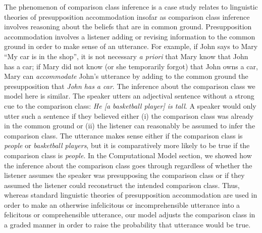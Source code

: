 \documentclass[doc]{apa6}
\begin{document}
The phenomenon of comparison class inference is a case study relates to linguistic theories of presupposition accommodation insofar as comparison class inference involves reasoning about the beliefs that are in common ground.
Presupposition accommodation involves a listener adding or revising information to the common ground in order to make sense of an utterance. For example, if John says to Mary ``My car is in the shop'', it is not necessary \emph{a priori} that Mary know that John has a car; if Mary did not know (or she temporarily forgot) that John owns a car, Mary can \emph{accommodate} John's utterance by adding to the common ground the presupposition that \emph{John has a car}. 
The inference about the comparison class we model here is similar. 
The speaker utters an adjectival sentence without a strong cue to the comparison class: \emph{He [a basketball player] is tall}. 
A speaker would only utter such a sentence if they believed either (i) the comparison class was already in the common ground or (ii) the listener can reasonably be assumed to infer the comparison class.
The utterance makes sense either if the comparison class is \emph{people} or \emph{basketball players}, but it is comparatively more likely to be true if the comparison class is \emph{people}. 
In the Computational Model section, we showed how the inference about the comparison class goes through regardless of whether the listener assumes the speaker was presupposing the comparison class or if they assumed the listener could reconstruct the intended comparison class.
Thus, whereas standard linguistic theories of presupposition accommodation are used in order to make an otherwise infelicitous or incomprehensible utterance into a felicitous or comprehensible utterance, our model adjusts the comparison class in a graded manner in order to raise the probability that utterance would be true.
 
\end{document}
